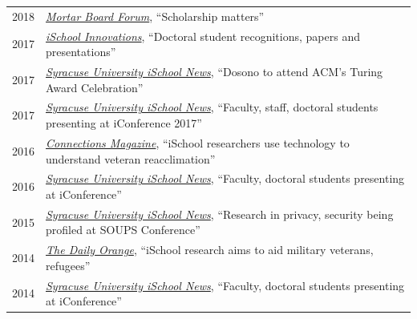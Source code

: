 \documentclass[12pt]{article}
\begin{document}
{\begin{longtable}{R{0.75in}p{5.0in}}
\footnotesize{2018} & \href{https://cdn.coverstand.com/35468/480339/07e4eb31edcfe2fac898ccb79316b89262b1bbe7.pdf}{\textit{Mortar Board Forum}}, ``Scholarship matters''\\

\footnotesize{2017} & \href{https://web.archive.org/web/20200506203625/https://issuu.com/ischoolsu/docs/su_ischool_innovations_fall-18/47}{\textit{iSchool Innovations}}, ``Doctoral student recognitions, papers and presentations''\\

\footnotesize{2017} & \href{https://web.archive.org/web/20170822004200/https://ischool.syr.edu/articles/news/view/dosono-to-attend-acm-turing-award-celebration/}{\textit{Syracuse University iSchool News}}, ``Dosono to attend ACM's Turing Award Celebration''\\

\footnotesize{2017} & \href{https://web.archive.org/web/20190329111412/https://ischool.syr.edu/articles/news/view/faculty-staff-phd-students-presenting-iconference-2017/}{\textit{Syracuse University iSchool News}}, ``Faculty, staff, doctoral students presenting at iConference 2017''\\

\footnotesize{2016} & \href{https://surface.syr.edu/cgi/viewcontent.cgi?article=1020&context=ischool_newsletter}{\textit{Connections Magazine}}, ``iSchool researchers use technology to understand veteran reacclimation''\\

\footnotesize{2016} & \href{https://web.archive.org/web/20190329112000/https://ischool.syr.edu/articles/news/view/faculty-phd-students-presenting-at-iconference-2016/}{\textit{Syracuse University iSchool News}}, ``Faculty, doctoral students presenting at iConference''\\

\footnotesize{2015} & \href{https://web.archive.org/web/20240817024426/https://ischool.syr.edu/research-in-privacy-security-profiled-at-soups-conference/}{\textit{Syracuse University iSchool News}}, ``Research in privacy, security being profiled at SOUPS Conference''\\

\footnotesize{2014} & \href{https://dailyorange.com/2014/11/ischool-research-aims-to-aid-military-veterans-refugees/}{\textit{The Daily Orange}}, ``iSchool research aims to aid military veterans, refugees''\\

\footnotesize{2014} & \href{https://web.archive.org/web/20190329112131/https://ischool.syr.edu/articles/news/view/faculty-doctoral-students-presenting-at-iconference/}{\textit{Syracuse University iSchool News}}, ``Faculty, doctoral students presenting at iConference''\\


\end{longtable}}
\end{document}
